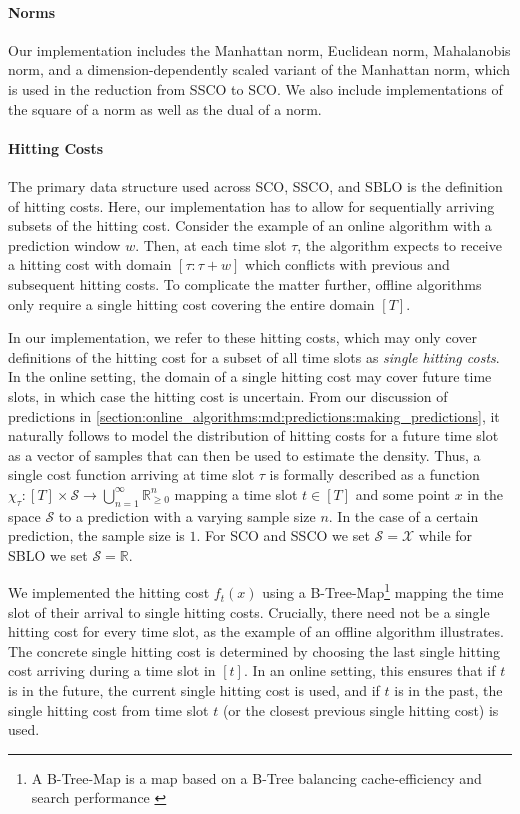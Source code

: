 \paragraph{Norms} Our implementation includes the Manhattan norm, Euclidean norm, Mahalanobis norm, and a dimension-dependently scaled variant of the Manhattan norm, which is used in the reduction from SSCO to SCO. We also include implementations of the square of a norm as well as the dual of a norm.

\paragraph{Hitting Costs} The primary data structure used across SCO, SSCO, and SBLO is the definition of hitting costs. Here, our implementation has to allow for sequentially arriving subsets of the hitting cost. Consider the example of an online algorithm with a prediction window $w$. Then, at each time slot $\tau$, the algorithm expects to receive a hitting cost with domain $[\tau : \tau + w]$ which conflicts with previous and subsequent hitting costs. To complicate the matter further, offline algorithms only require a single hitting cost covering the entire domain $[T]$.

In our implementation, we refer to these hitting costs, which may only cover definitions of the hitting cost for a subset of all time slots as \emph{single hitting costs}. In the online setting, the domain of a single hitting cost may cover future time slots, in which case the hitting cost is uncertain. From our discussion of predictions in \autoref{section:online_algorithms:md:predictions:making_predictions}, it naturally follows to model the distribution of hitting costs for a future time slot as a vector of samples that can then be used to estimate the density. Thus, a single cost function arriving at time slot $\tau$ is formally described as a function $\chi_{\tau} : [T] \times \mathcal{S} \to \bigcup_{n=1}^{\infty} \mathbb{R}_{\geq 0}^n$ mapping a time slot $t \in [T]$ and some point $x$ in the space $\mathcal{S}$ to a prediction with a varying sample size $n$. In the case of a certain prediction, the sample size is $1$. For SCO and SSCO we set $\mathcal{S} = \mathcal{X}$ while for SBLO we set $\mathcal{S} = \mathbb{R}$.

We implemented the hitting cost $f_t(x)$ using a B-Tree-Map\footnote{A B-Tree-Map is a map based on a B-Tree balancing cache-efficiency and search performance \cite{BTreeMap}} mapping the time slot of their arrival to single hitting costs. Crucially, there need not be a single hitting cost for every time slot, as the example of an offline algorithm illustrates. The concrete single hitting cost is determined by choosing the last single hitting cost arriving during a time slot in $[t]$. In an online setting, this ensures that if $t$ is in the future, the current single hitting cost is used, and if $t$ is in the past, the single hitting cost from time slot $t$ (or the closest previous single hitting cost) is used.


